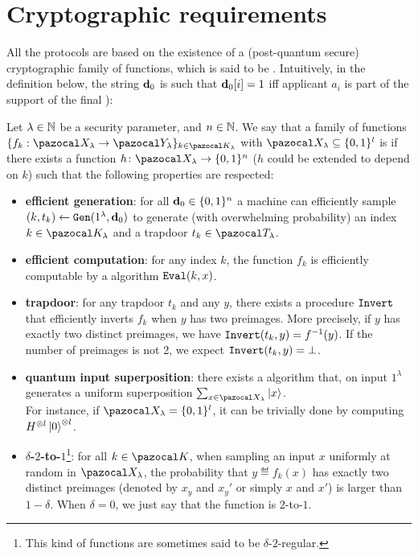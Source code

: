 \section{Cryptographic requirements}\label{sec:crypto_requirements}
All the protocols are based on the existence of a (post-quantum secure) cryptographic family of functions, which is said to be \AssumpFct{}. Intuitively, in the definition below, the string $\mathbf{d}_0$ is such that $\mathbf{d}_0[i] = 1$ iff applicant $a_i$ is part of the support of the final \GHZ{}):
\begin{definition}\label{def:fct_requirements}
  Let $\lambda \in \mathbb{N}$ be a security parameter, and $n \in \mathbb{N}$. We say that a family of functions $\{f_k: \cX_\lambda \rightarrow \cY_\lambda \}_{k \in \cK_\lambda}$ with $\cX_\lambda \subseteq \{0,1\}^l$ is \AssumpFct{} if there exists a function $h\colon \cX_\lambda \rightarrow \{0,1\}^{n}$ ($h$ could be extended to depend on $k$) such that the following properties are respected:
  \begin{itemize}
  \item \textbf{efficient generation}: for all $\mathbf{d}_0 \in \{0,1\}^{n}$ a \PPT{} machine can efficiently sample $(k, t_k) \leftarrow {\tt Gen}(1^\lambda, \mathbf{d}_0)$ to generate (with overwhelming probability) an index $k \in \cK_\lambda$ and a trapdoor $t_k \in \cT_\lambda$.
  \item \textbf{efficient computation}: for any index $k$, the function $f_k$ is efficiently computable by a \PPT{} algorithm ${\tt Eval}(k,x)$.
  \item \textbf{trapdoor}: for any trapdoor $t_k$ and any $y$, there exists a procedure ${\tt Invert}$ that efficiently inverts $f_k$ when $y$ has two preimages. More precisely, if $y$ has exactly two distinct preimages, we have ${\tt Invert}(t_k, y) = f^{-1}(y)$. If the number of preimages is not 2, we expect ${\tt Invert}(t_k,y) = \bot$.
  \item \textbf{quantum input superposition}: there exists a \QPT{} algorithm that, on input $1^\lambda$ generates a uniform superposition $\sum_{x \in \cX_\lambda} \ket{x}$.\\
    For instance, if $\cX_\lambda = \{0,1\}^l$, it can be trivially done by computing $H^{\otimes l}\ket{0}^{\otimes l}$.
  \item \textbf{$\delta$-$2$-to-$1$}\footnote{This kind of functions are sometimes said to be $\delta$-$2$-regular.}: for all $k \in \cK$, when sampling an input $x$ uniformly at random in $\cX_\lambda$, the probability that $y \eqdef f_k(x)$ has exactly two distinct preimages (denoted by $x_y$ and $x_y'$ or simply $x$ and $x'$) is larger than $1-\delta$. When $\delta = 0$, we just say that the function is $2$-to-$1$.

\end{itemize}
\end{definition}
